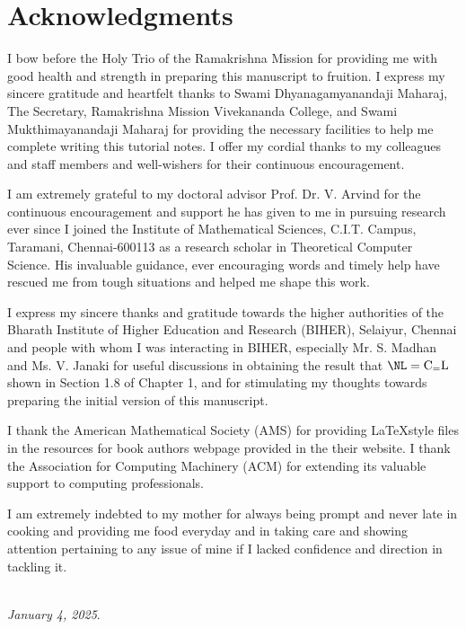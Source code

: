 \documentclass{amsbook}
\theoremstyle{definition}
\theoremstyle{remark}
\numberwithin{section}{chapter}
\numberwithin{equation}{chapter}
\newcommand{\CeqL}{\mbox{\rm C$_=$L}}
\begin{document}
\chapter*{Acknowledgments}
I bow before the Holy Trio of the Ramakrishna Mission for providing me with good health and strength in preparing this manuscript to fruition. I express my sincere gratitude and heartfelt thanks to Swami Dhyanagamyanandaji Maharaj, The Secretary, Ramakrishna Mission Vivekananda College, and Swami Mukthimayanandaji Maharaj for providing the necessary facilities to help me complete writing this tutorial notes. I offer my cordial thanks to my colleagues and staff members and well-wishers for their continuous encouragement.

I am extremely grateful to my doctoral advisor Prof. Dr. V. Arvind for the continuous encouragement and support he has given to me in pursuing research ever since I joined the Institute of Mathematical Sciences, C.I.T. Campus, Taramani, Chennai-600113 as a research scholar in Theoretical Computer Science. His invaluable guidance, ever encouraging words and timely help have rescued me from tough situations and helped me shape this work.

I express my sincere thanks and gratitude towards the higher authorities of the Bharath Institute of Higher Education and Research (BIHER), Selaiyur, Chennai and people with whom I was interacting in BIHER, especially Mr. S. Madhan and Ms. V. Janaki for useful discussions in obtaining the result that $\NL =\CeqL$ shown in Section 1.8 of Chapter 1, and for stimulating my thoughts towards preparing the initial version of this manuscript.

I thank the American Mathematical Society (AMS) for providing \LaTeX style files in the resources for book authors webpage provided in the their website. I thank the Association for Computing Machinery (ACM) for extending its valuable support to computing professionals.

I am extremely indebted to my mother for always being prompt and never late in cooking and providing me food everyday and in taking care and showing attention pertaining to any issue of mine if I lacked confidence and direction in tackling it.
\vspace{12pt}

\\
{\it January 4, 2025}.
\end{document}
